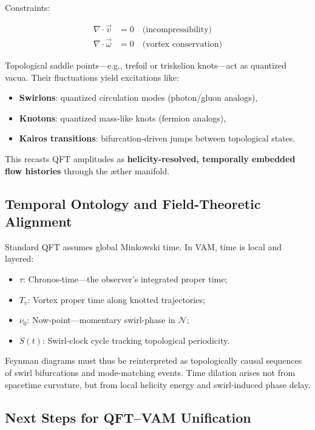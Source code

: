 Constraints:

\begin{align}
\nabla \cdot \vec{v} &= 0 \quad \text{(incompressibility)} \\
\nabla \cdot \vec{\omega} &= 0 \quad \text{(vortex conservation)}
\end{align}

Topological saddle points—e.g., trefoil or triskelion knots—act as quantized vacua. Their fluctuations yield excitations like:

\begin{itemize}
    \item \textbf{Swirlons}: quantized circulation modes (photon/gluon analogs),
    \item \textbf{Knotons}: quantized mass-like knots (fermion analogs),
    \item \textbf{Kairos transitions}: bifurcation-driven jumps between topological states.
\end{itemize}

This recasts QFT amplitudes as \textbf{helicity-resolved, temporally embedded flow histories} through the æther manifold.

\subsection{Temporal Ontology and Field-Theoretic Alignment}

Standard QFT assumes global Minkowski time. In VAM, time is local and layered:

\begin{itemize}
    \item \( \tau \): Chronos-time—the observer’s integrated proper time;
    \item \( T_v \): Vortex proper time along knotted trajectories;
    \item \( \nu_0 \): Now-point—momentary swirl-phase in \( \mathcal{N} \);
    \item \( S(t) \): Swirl-clock cycle tracking topological periodicity.
\end{itemize}

Feynman diagrams must thus be reinterpreted as topologically causal sequences of swirl bifurcations and mode-matching events. Time dilation arises not from spacetime curvature, but from local helicity energy and swirl-induced phase delay.

\subsection{Next Steps for QFT--VAM Unification}

